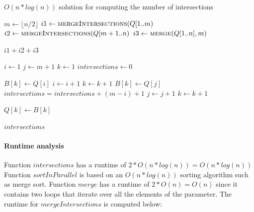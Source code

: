 \begin{algorithm} [H]
	\caption{$O(n * log(n))$ solution for computing the number of intersections}
	\begin{algorithmic}
	
	  	\State {} 
		
		\Return {} 
	  \EndFunction
	  
	  \EndFunction
	  
		
		\EndIf
	  
	  	\State $m \gets \lfloor n/2 \rfloor$
		\State $i1 \gets \Call{mergeIntersections}{Q[1 .. m}$	
		\State $i2 \gets \Call{mergeIntersections}{Q[m + 1 .. n}$
		\State $i3 \gets \Call{merge}{Q[1 .. n], m}$ 
	 
	 	\Return $i1 + i2 + i3$
	  \EndFunction
	  
	  	\State $i \gets 1$
	  	\State $j \gets m + 1$
		\State $k \gets 1$
	  	\State $intersections \gets 0$
		
				\State $B[k] \gets Q[i]$
				\State $i \gets i + 1$ 
				\State $k \gets k + 1$
			\Else
				\State $B[k] \gets Q[j]$
				\State $intersections = intersections + (m - i) + 1$
				\State $j \gets j + 1$ 
				\State $k \gets k + 1$
			\EndIf
		
				\State $Q[k] \gets B[k]$
			\EndFor
			
			\Return $intersections$
		\EndWhile
	  
	  \EndFunction
	  \end{algorithmic}
	  
	  \paragraph{Runtime analysis}
	  
	  Function $intersections$ has a runtime of $2*O(n* log(n)) = O(n* log(n))$
	  Function $sortInParallel$ is based on an $O(n* log(n))$ sorting algorithm such as merge sort.
	  Function $merge$ has a runtime of $2*O(n) = O(n)$ since it contains two loops that iterate over all the elements of the parameter.
	  The runtime for $mergeIntersections$ is computed below:
	  
\end{algorithm}
